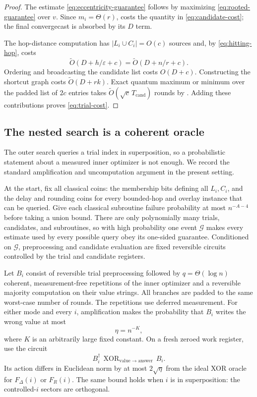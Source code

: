 \documentclass[11pt]{article}
\theoremstyle{definition}
\newcommand{\eps}{\varepsilon}
\newcommand{\wtO}{\widetilde O}
\begin{document}
\begin{proof}
The estimate \eqref{eq:eccentricity-guarantee} follows by maximizing
\eqref{eq:rooted-guarantee} over $v$.  Since $m_i=\Theta(r)$,
 costs the quantity in
\eqref{eq:candidate-cost}; the final convergecast is absorbed by its $D$ term.

The hop-distance computation has $|L_i\cup C_i|=O(c)$ sources and, by
\eqref{eq:hitting-hop}, costs
\[
  \wtO(D+h/\eps+c)=\wtO(D+n/r+c).
\]
Ordering and broadcasting the candidate list costs $O(D+c)$.  Constructing
the shortcut graph costs $\wtO(D+rk)$.  Exact quantum maximum or minimum over
the padded list of $2c$ entries takes
$\wtO(\sqrt c\,T_{\mathrm{cand}})$ rounds by
.  Adding these contributions proves
\eqref{eq:trial-cost}.
\end{proof}

\subsection{The nested search is a coherent oracle}
\label{sec:coherence}

The outer search queries a trial index in superposition, so a probabilistic
statement about a measured inner optimizer is not enough.  We record the
standard amplification and uncomputation argument in the present setting.

At the start, fix all classical coins: the membership bits defining all
$L_i,C_i$, and the delay and rounding coins for every bounded-hop and overlay
instance that can be queried.  Give each classical subroutine failure
probability at most $n^{-A-4}$ before taking a union bound.  There are only
polynomially many trials, candidates, and subroutines, so with high probability
one event $\mathcal G$ makes every estimate used by every possible query obey
its one-sided guarantee.  Conditioned on $\mathcal G$, preprocessing and
candidate evaluation are fixed reversible circuits controlled by the trial
and candidate registers.

Let $B_i$ consist of reversible trial preprocessing followed by
$q=\Theta(\log n)$ coherent, measurement-free repetitions of the inner
optimizer and a reversible majority computation on their value strings.  All
branches are padded to the same worst-case number of rounds.  The repetitions
use deferred measurement.  For either mode and every $i$, amplification makes
the probability that $B_i$ writes the wrong value at most
\[
  \eta=n^{-K},
\]
where $K$ is an arbitrarily large fixed constant.  On a fresh zeroed work
register, use the circuit
\[
  B_i^\dagger\,
  \operatorname{XOR}_{\mathrm{value}\to\mathrm{answer}}\,
  B_i.
  \tag{14}\label{eq:clean-oracle}
\]
Its action differs in Euclidean norm by at most $2\sqrt\eta$ from the ideal
XOR oracle for $F_\Delta(i)$ or $F_R(i)$.  The same bound holds when $i$ is in
superposition: the controlled-$i$ sectors are orthogonal.
\end{document}
